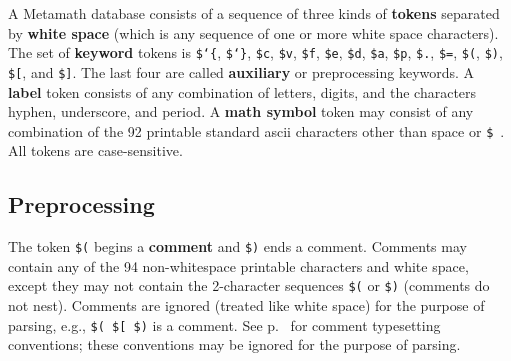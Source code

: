 A Metamath database consists of a sequence of three kinds of {\bf
tokens} separated by {\bf white space}
(which is any sequence of one or more white space characters).  The set
of {\bf keyword} tokens is \texttt{\$\char`\{},
\texttt{\$\char`\}}, \texttt{\$c}, \texttt{\$v}, \texttt{\$f},
\texttt{\$e}, \texttt{\$d}, \texttt{\$a}, \texttt{\$p}, \texttt{\$.},
\texttt{\$=}, \texttt{\$(}, \texttt{\$)}, \texttt{\$[}, and
\texttt{\$]}.  The last four are called {\bf auxiliary} or preprocessing keywords.  A {\bf label} token
consists of any combination of letters, digits, and the characters
hyphen, underscore, and period.  A {\bf math symbol}
token may consist of any combination of the 92 printable standard {\sc
ascii} characters other than space or \texttt{\$}~. All tokens are
case-sensitive.

\subsection{Preprocessing}

The token \texttt{\$(} begins a {\bf comment} and
\texttt{\$)} ends a comment.
Comments may contain any of
the 94 non-whitespace printable characters and white space,
except they may not contain the
2-character sequences \texttt{\$(} or \texttt{\$)} (comments do not nest).
Comments are ignored (treated
like white space) for the purpose of parsing, e.g.,
\texttt{\$( \$[ \$)} is a comment.
See p.~\pageref{mathcomments} for comment typesetting conventions; these
conventions may be ignored for the purpose of parsing.

